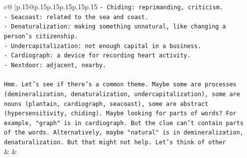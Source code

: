 \documentclass{article}
\begin{document}
{\begin{supertabular}{c@{$\;$}|p{.15\linewidth}@{}p{.15\linewidth}p{.15\linewidth}p{.15\linewidth}p{.15\linewidth}p{.15\linewidth}}
{{{\texttt{{-} Chiding: reprimanding, criticism.} \\
\texttt{{-} Seacoast: related to the sea and coast.} \\
\texttt{{-} Denaturalization: making something unnatural, like changing a person's citizenship.} \\
\texttt{{-} Undercapitalization: not enough capital in a business.} \\
\texttt{{-} Cardiograph: a device for recording heart activity.} \\
\texttt{{-} Nextdoor: adjacent, nearby.} \\
\\ 
\texttt{Hmm. Let's see if there's a common theme. Maybe some are processes (demineralization, denaturalization, undercapitalization), some are nouns (plantain, cardiograph, seacoast), some are abstract (hypersensitivity, chiding). Maybe looking for parts of words? For example, "graph" is in cardiograph. But the clue can't contain parts of the words. Alternatively, maybe "natural" is in demineralization, denaturalization. But that might not help. Let's think of other} \\
            }
        }
    }
    & & \\ \\


\end{supertabular}}
\end{document}
